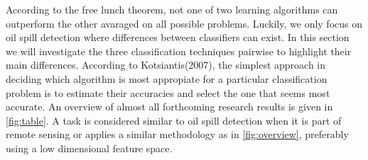  

According to the free lunch theorem, not one of two learning algorithms can outperform the other avaraged on all possible problems. Luckily, we only focus on oil spill detection where differences between classifiers can exist. In this section we will investigate the three classification techniques pairwise to highlight their main differences. According to Kotsiantis(2007), the simplest approach in deciding which algorithm is most appropiate for a particular classification problem is to estimate their accuracies and select the one that seems most accurate\cite{kotsiantis2007supervised}. An overview of almost all forthcoming research results is given in \ref{fig:table}. A task is considered similar to oil spill detection when it is part of remote sensing or applies a similar methodology as in \ref{fig:overview}, preferably using a low dimensional feature space.